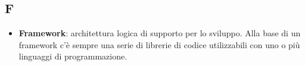 \subsection{F}
\begin{itemize}
	\item
	\textbf{Framework}: architettura logica di supporto per lo sviluppo. Alla base di un framework c’è sempre una serie di librerie di codice utilizzabili con uno o più linguaggi di programmazione.
\end{itemize}